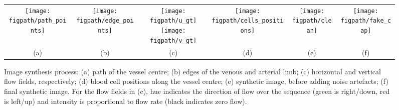 \begin{figure*}[t]
\centering
\setlength{\figwidth}{0.10\textwidth}
\begin{tabular}{c c c c c c}
  \texttt{[image: \\figpath/path\_points]} &
  \texttt{[image: \\figpath/edge\_points]} &
  \texttt{[image: \\figpath/u\_gt]}
  \texttt{[image: \\figpath/v\_gt]} &
  \texttt{[image: \\figpath/cells\_positions]} &
  \texttt{[image: \\figpath/clean]} &
  \texttt{[image: \\figpath/fake\_cap]} \\
  (a) & (b) & (c) & (d) & (e) & (f)
\end{tabular}
%
\caption{Image synthesis process: (a) path of the vessel centre; (b) edges of the venous and arterial limb; (c) horizontal and vertical flow fields, respectively; (d) blood cell positions along the vessel centre; (e) synthetic image, before adding noise artefacts; (f) final synthetic image. For the flow fields in (c), hue indicates the direction of flow over the sequence (green is right/down, red is left/up) and intensity is proportional to flow rate (black indicates zero flow).}
\label{fig_image_generation}
\end{figure*}
